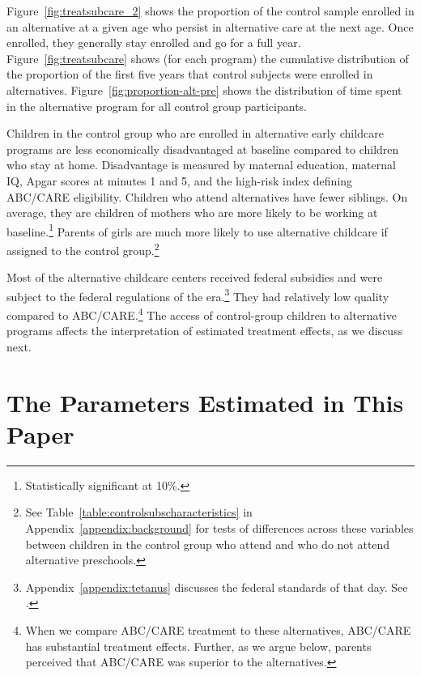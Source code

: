 Figure~\ref{fig:treatsubcare_2} shows the proportion of the control sample enrolled in an alternative at a given age who persist in alternative care at the next age. Once enrolled, they generally stay enrolled and go for a full year.  Figure~\ref{fig:treatsubcare} shows (for each program) the cumulative distribution of the proportion of the first five years that control subjects were enrolled in alternatives. Figure~\ref{fig:proportion-alt-pre} shows the distribution of time spent in the alternative program for all control group participants.

Children in the control group who are enrolled in alternative early childcare programs are less economically disadvantaged at baseline compared to children who stay at home. Disadvantage is measured by maternal education, maternal IQ, Apgar scores at minutes 1 and 5, and the high-risk index defining ABC/CARE eligibility. Children who attend alternatives have fewer siblings. On average, they are children of mothers who are more likely to be working at baseline.\footnote{Statistically significant at 10\%.} Parents of girls are much more likely to use alternative childcare if assigned to the control group.\footnote{See Table~\ref{table:controlsubscharacteristics} in Appendix~\ref{appendix:background} for tests of differences across these variables between children in the control group who attend and who do not attend alternative preschools.}

Most of the alternative childcare centers received federal subsidies and were subject to the federal regulations of the era.\footnote{Appendix~\ref{appendix:tetanus} discusses the federal standards of that day. See \citet{Department-of-Health_1968_DayCareRequirements,NCGA_1971_House-Bill-100,Ramey-et-al_1977_Intro-to-ABC,Ramey_Campbell_1979_SR,Ramey_McGinness_etal_1982_Abecedarianapproach, Burchinal_Campbell_etal_1997_CD}.} They had relatively low quality compared to ABC/CARE.\footnote{When we compare ABC/CARE treatment to these alternatives, ABC/CARE has substantial treatment effects. Further, as we argue below, parents perceived that ABC/CARE was superior to the alternatives.} The access of control-group children to alternative programs affects the interpretation of estimated treatment effects, as we discuss next.

\section{The Parameters Estimated in This Paper} \label{section:methodsquestions}

